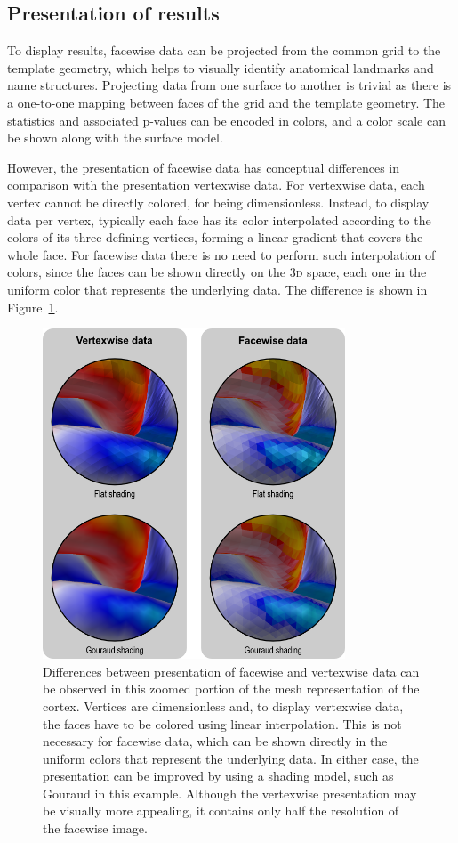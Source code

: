 \subsection{Presentation of results}
\label{sec:presentation}

To display results, facewise data can be projected from the common grid to the template geometry, which helps to visually identify anatomical landmarks and name structures. Projecting data from one surface to another is trivial as there is a one-to-one mapping between faces of the grid and the template geometry. The statistics and associated p-values can be encoded in colors, and a color scale can be shown along with the surface model.

However, the presentation of facewise data has conceptual differences in comparison with the presentation vertexwise data. For vertexwise data, each vertex cannot be directly colored, for being dimensionless. Instead, to display data per vertex, typically each face has its color interpolated according to the colors of its three defining vertices, forming a linear gradient that covers the whole face. For facewise data there is no need to perform such interpolation of colors, since the faces can be shown directly on the \textsc{3d} space, each one in the uniform color that represents the underlying data. The difference is shown in Figure~\ref{fig:display}.

\begin{figure}[!tp]  %
\centering
\includegraphics[width=9cm]{images/display.png}
\caption[Differences between presentation of facewise and vertexwise area.]{Differences between presentation of facewise and vertexwise data can be observed in this zoomed portion of the mesh representation of the cortex. Vertices are dimensionless and, to display vertexwise data, the faces have to be colored using linear interpolation. This is not necessary for facewise data, which can be shown directly in the uniform colors that represent the underlying data. In either case, the presentation can be improved by using a shading model, such as Gouraud in this example. Although the vertexwise presentation may be visually more appealing, it contains only half the resolution of the facewise image.}
\label{fig:display}
\end{figure}

